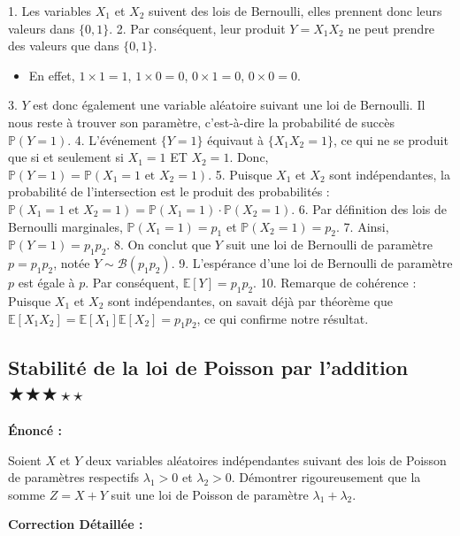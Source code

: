 \documentclass[11pt,a4paper]{article}
\begin{document}
1. Les variables $X_1$ et $X_2$ suivent des lois de Bernoulli, elles prennent donc leurs valeurs dans $\{0, 1\}$.
2. Par conséquent, leur produit $Y = X_1 X_2$ ne peut prendre des valeurs que dans $\{0, 1\}$.
\begin{itemize}
\item En effet, $1 \times 1 = 1$, $1 \times 0 = 0$, $0 \times 1 = 0$, $0 \times 0 = 0$.
\end{itemize}3. $Y$ est donc également une variable aléatoire suivant une loi de Bernoulli. Il nous reste à trouver son paramètre, c'est-à-dire la probabilité de succès $\mathbb{P}(Y = 1)$.
4. L'événement $\{Y = 1\}$ équivaut à $\{X_1 X_2 = 1\}$, ce qui ne se produit que si et seulement si $X_1 = 1$ ET $X_2 = 1$.
   Donc, $\mathbb{P}(Y = 1) = \mathbb{P}(X_1 = 1 \text{ et } X_2 = 1)$.
5. Puisque $X_1$ et $X_2$ sont indépendantes, la probabilité de l'intersection est le produit des probabilités :
   $\mathbb{P}(X_1 = 1 \text{ et } X_2 = 1) = \mathbb{P}(X_1 = 1) \cdot \mathbb{P}(X_2 = 1)$.
6. Par définition des lois de Bernoulli marginales, $\mathbb{P}(X_1 = 1) = p_1$ et $\mathbb{P}(X_2 = 1) = p_2$.
7. Ainsi, $\mathbb{P}(Y = 1) = p_1 p_2$.
8. On conclut que $Y$ suit une loi de Bernoulli de paramètre $p = p_1 p_2$, notée $Y \sim \mathcal{B}(p_1 p_2)$.
9. L'espérance d'une loi de Bernoulli de paramètre $p$ est égale à $p$. Par conséquent, $\mathbb{E}[Y] = p_1 p_2$.
10. Remarque de cohérence : Puisque $X_1$ et $X_2$ sont indépendantes, on savait déjà par théorème que $\mathbb{E}[X_1 X_2] = \mathbb{E}[X_1]\mathbb{E}[X_2] = p_1 p_2$, ce qui confirme notre résultat.


\subsection*{ Stabilité de la loi de Poisson par l'addition \quad $\bigstar\bigstar\bigstar\star\star$}

\textbf{Énoncé :}

Soient $X$ et $Y$ deux variables aléatoires indépendantes suivant des lois de Poisson de paramètres respectifs $\lambda_1 > 0$ et $\lambda_2 > 0$.
Démontrer rigoureusement que la somme $Z = X + Y$ suit une loi de Poisson de paramètre $\lambda_1 + \lambda_2$.

\textbf{Correction Détaillée :}
\end{document}
